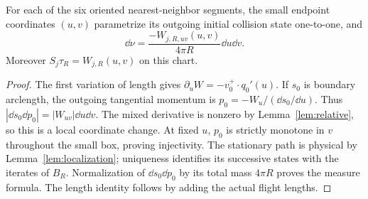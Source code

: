 \begin{proposition}\label{prop:endpoint-flux}
For each of the six oriented nearest-neighbor segments, the small
endpoint coordinates $(u,v)$ parametrize its outgoing initial collision
state one-to-one, and
\begin{equation}\label{eq:endpoint-flux}
 \dd\nu=\frac{-W_{j,R,uv}(u,v)}{4\pi R}\dd u\dd v.
\end{equation}
Moreover $S_j\tau_R=W_{j,R}(u,v)$ on this chart.
\end{proposition}
\begin{proof}
The first variation of length gives
$\partial_uW=-v_0^+\cdot q_0'(u)$. If $s_0$ is boundary arclength,
the outgoing tangential momentum is
$p_0=-W_u/(\dd s_0/\dd u)$. Thus
$|\dd s_0\dd p_0|=|W_{uv}|\dd u\dd v$.
The mixed derivative is nonzero by Lemma~\ref{lem:relative}, so this
is a local coordinate change. At fixed $u$, $p_0$ is strictly monotone
in $v$ throughout the small box, proving injectivity. The stationary
path is physical by Lemma~\ref{lem:localization}; uniqueness identifies
its successive states with the iterates of $B_R$. Normalization of
$\dd s_0\dd p_0$ by its total mass $4\pi R$ proves the measure formula.
The length identity follows by adding the actual flight lengths.
\end{proof}
